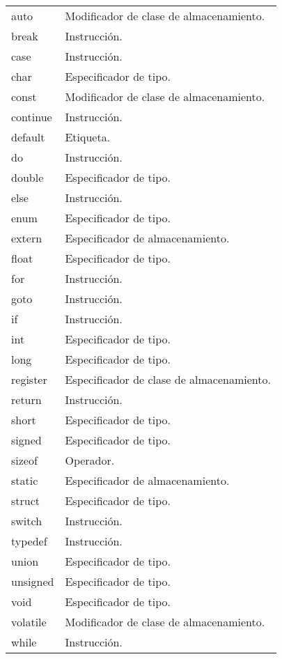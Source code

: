 \documentclass[12pt, A4]{article}
\begin{document}
{{\begin{longtable}[h]{p{3cm} p{10cm}}
		
		auto & Modificador de clase de almacenamiento. \\ 
		\rowcolor{gray!20}break & Instrucción. \\
		case & Instrucción. \\	
	\rowcolor{gray!20}	char  & Especificador de tipo. \\	
		const & Modificador de clase de almacenamiento. \\
	\rowcolor{gray!20}	continue & Instrucción.\\
		default  & Etiqueta. \\
	\rowcolor{gray!20}	do & Instrucción. \\
		double & Especificador de tipo.\\	
	\rowcolor{gray!20}	else & Instrucción. \\
		enum &  Especificador de tipo. \\
	\rowcolor{gray!20}	extern &Especificador de almacenamiento. \\
		float & Especificador de tipo. \\
	\rowcolor{gray!20}	for & Instrucción. \\
		goto & Instrucción. \\
	\rowcolor{gray!20}	if &  Instrucción. \\
		int  & Especificador de tipo. \\ 
	\rowcolor{gray!20}	long & Especificador de tipo. \\
		register & Especificador de clase de almacenamiento.\\
	\rowcolor{gray!20}	return & Instrucción. \\
		short & Especificador de tipo. \\
	\rowcolor{gray!20}	signed & Especificador de tipo. \\
		sizeof & Operador. \\
	\rowcolor{gray!20}	static & Especificador de almacenamiento. \\
		struct & Especificador de tipo. \\ 
	\rowcolor{gray!20}	switch & Instrucción. \\
		typedef &  Instrucción. \\
	\rowcolor{gray!20}	union & Especificador de tipo. \\
		unsigned & Especificador de tipo. \\
	\rowcolor{gray!20}	void & Especificador de tipo. \\
		volatile & Modificador de clase de almacenamiento. \\
	\rowcolor{gray!20}	while & Instrucción. \\ \hline


\end{longtable}}}
\end{document}
